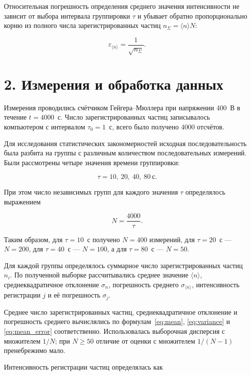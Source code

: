\documentclass[12pt,a4paper]{article}
\begin{document}
Относительная погрешность определения среднего значения интенсивности не зависит от выбора интервала группировки $\tau$ и убывает обратно пропорционально корню из полного числа зарегистрированных частиц $n_\Sigma = \langle n\rangle N$:

\begin{equation}
    \varepsilon_{\langle n\rangle} = \frac{1}{\sqrt{n_\Sigma}}.
    \label{eq:rel_error}
\end{equation}

\section*{2. Измерения и обработка данных}

Измерения проводились счётчиком Гейгера--Мюллера при напряжении 400~В в течение $t=4000$~с. Число зарегистрированных частиц записывалось компьютером с интервалом $\tau_0=1$~с, всего было получено 4000 отсчётов.

Для исследования статистических закономерностей исходная последовательность была разбита на группы с различным количеством последовательных измерений. Были рассмотрены четыре значения времени группировки:

\[
\tau=10,\ 20,\ 40,\ 80~\text{с}.
\]

При этом число независимых групп для каждого значения $\tau$ определялось выражением

\begin{equation}
    N=\frac{4000}{\tau}.
    \label{eq:N}
\end{equation}

Таким образом, для $\tau=10$~с получено $N=400$ измерений, для $\tau=20$~с --- $N=200$, для $\tau=40$~с --- $N=100$, а для $\tau=80$~с --- $N=50$.

Для каждой группы определялось суммарное число зарегистрированных частиц $n_i$. По полученной выборке рассчитывались среднее значение $\langle n\rangle$, среднеквадратичное отклонение $\sigma_n$, погрешность среднего $\sigma_{\langle n\rangle}$, интенсивность регистрации $j$ и её погрешность $\sigma_j$.

Среднее число зарегистрированных частиц, среднеквадратичное отклонение и погрешность среднего вычислялись по формулам~\eqref{eq:mean}, \eqref{eq:variance} и \eqref{eq:mean_error} соответственно. Использовалась выборочная дисперсия с множителем $1/N$; при $N\ge 50$ отличие от оценки с множителем $1/(N-1)$ пренебрежимо мало.

Интенсивность регистрации частиц определялась как
\end{document}
